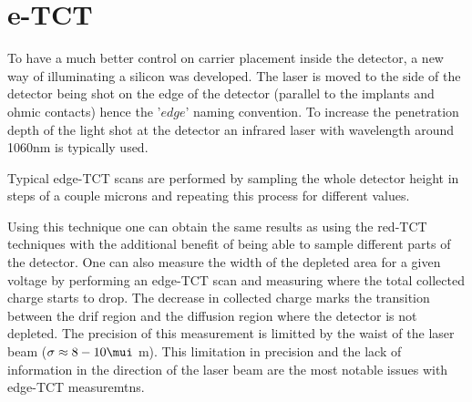 

\section{e-TCT} %

To have a much better control on carrier placement inside the detector, a new way of illuminating a silicon was developed. The laser is moved to the side of the detector being shot on the edge of the detector (parallel to the implants and ohmic contacts) hence the '$edge$' naming convention. To increase the penetration depth of the light shot at the detector an infrared laser with wavelength around 1060nm is typically used. 

Typical edge-TCT scans are performed by sampling the whole detector height in steps of a couple microns and repeating this process for different \vias values.

Using this technique one can obtain the same results as using the red-TCT techniques with the additional benefit of being able to sample different parts of the detector. One can also measure the width of the depleted area for a given voltage by performing an edge-TCT scan and measuring where the total 
collected charge starts to drop. The decrease in collected charge marks the transition between the drif region and the diffusion region where the detector is not depleted. The precision of this measurement is limitted by the waist of the laser beam ($\sigma \approx 8-10\mui$ m). This limitation in precision and the lack of information in the direction of the laser beam are the most notable issues with edge-TCT measuremtns.

